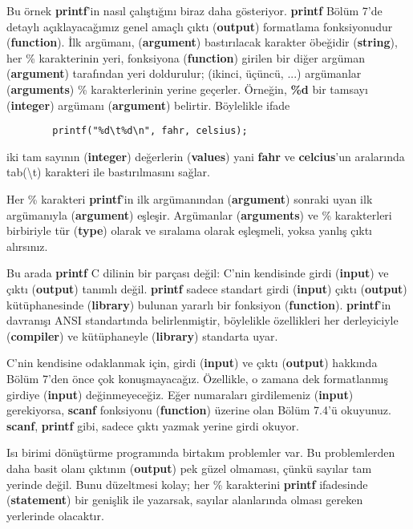 \documentclass[a4paper,12pt,oneside]{book}
\begin{document}
\par Bu örnek \textbf{printf}'in nasıl çalıştığını biraz daha gösteriyor. \textbf{printf} Bölüm 7'de detaylı açıklayacağımız genel amaçlı çıktı (\textbf{output}) formatlama fonksiyonudur (\textbf{function}). İlk argümanı, (\textbf{argument}) bastırılacak karakter öbeğidir (\textbf{string}), her \% karakterinin yeri, fonksiyona (\textbf{function}) girilen bir diğer argüman (\textbf{argument}) tarafından yeri doldurulur; (ikinci, üçüncü, ...) argümanlar (\textbf{arguments}) \% karakterlerinin yerine geçerler. Örneğin, \textbf{\%d} bir tamsayı (\textbf{integer}) argümanı (\textbf{argument}) belirtir. Böylelikle ifade
\begin{lstlisting}
        printf("%d\t%d\n", fahr, celsius);
\end{lstlisting}
iki tam sayının (\textbf{integer}) değerlerin (\textbf{values}) yani \textbf{fahr} ve \textbf{celcius}'un aralarında tab(\textbackslash t) karakteri ile bastırılmasını sağlar.
\par Her \% karakteri \textbf{printf}'in ilk argümanından (\textbf{argument}) sonraki uyan ilk argümanıyla (\textbf{argument}) eşleşir. Argümanlar (\textbf{arguments}) ve \% karakterleri birbiriyle tür (\textbf{type}) olarak ve sıralama olarak eşleşmeli, yoksa yanlış çıktı alırsınız.
\par Bu arada \textbf{printf} C dilinin bir parçası değil: C'nin kendisinde girdi (\textbf{input}) ve çıktı (\textbf{output}) tanımlı değil. \textbf{printf} sadece standart girdi (\textbf{input}) çıktı (\textbf{output}) kütüphanesinde (\textbf{library}) bulunan yararlı bir fonksiyon (\textbf{function}). \textbf{printf}'in davranışı ANSI standartında belirlenmiştir, böylelikle özellikleri her derleyiciyle (\textbf{compiler}) ve kütüphaneyle (\textbf{library}) standarta uyar.
\par C'nin kendisine odaklanmak için, girdi (\textbf{input}) ve çıktı (\textbf{output}) hakkında Bölüm 7'den önce çok konuşmayacağız. Özellikle, o zamana dek formatlanmış girdiye (\textbf{input}) değinmeyeceğiz. Eğer numaraları girdilemeniz (\textbf{input}) gerekiyorsa, \textbf{scanf} fonksiyonu (\textbf{function}) üzerine olan Bölüm 7.4'ü okuyunuz. \textbf{scanf}, \textbf{printf} gibi, sadece çıktı yazmak yerine girdi okuyor. \pagebreak
\par Isı birimi dönüştürme programında birtakım problemler var. Bu problemlerden daha basit olanı çıktının (\textbf{output}) pek güzel olmaması, çünkü sayılar tam yerinde değil. Bunu düzeltmesi kolay; her \% karakterini \textbf{printf} ifadesinde (\textbf{statement}) bir genişlik ile yazarsak, sayılar alanlarında olması gereken yerlerinde olacaktır.
\end{document}
